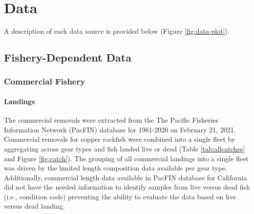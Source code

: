 \documentclass[11pt,
  english,
  a4paper,
]{article}
\begin{document}
\leavevmode\tagmcend\tagstructend\par


\hypertarget{data}{%
\section{Data}\label{data}}

\leavevmode\tagmcend\tagstructend


A description of each data source is provided below (Figure \ref{fig:data-plot}).

\leavevmode\tagmcend\tagstructend\par


\hypertarget{fishery-dependent-data}{%
\subsection{Fishery-Dependent Data}\label{fishery-dependent-data}}

\leavevmode\tagmcend\tagstructend


\hypertarget{commercial-fishery}{%
\subsubsection{Commercial Fishery}\label{commercial-fishery}}

\leavevmode\tagmcend\tagstructend


\hypertarget{landings}{%
\paragraph{Landings}\label{landings}}

\leavevmode\tagmcend\tagstructend


The commercial removals were extracted from the The Pacific Fisheries Information Network (PacFIN) database for 1981-2020 on February 21, 2021. Commercial removals for copper rockfish were combined into a single fleet by aggregating across gear types and fish landed live or dead (Table \ref{tab:allcatches} and Figure \ref{fig:catch}). The grouping of all commercial landings into a single fleet was driven by the limited length composition data available per gear type. Additionally, commercial length data available in PacFIN database for California did not have the needed information to identify samples from live versus dead fish (i.e., condition code) preventing the ability to evaluate the data based on live versus dead landing.
\end{document}
